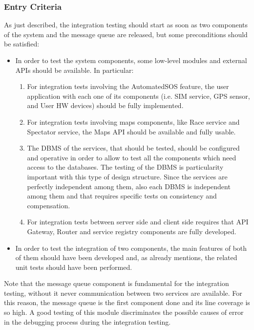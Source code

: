 \subsubsection{Entry Criteria}
As just described, the integration testing should start as soon as two components of the system and the message queue are released, but some preconditions should be satisfied:
\begin{itemize}
\item In order to test the system components, some low-level modules and external APIs should be available. In particular: 
\begin{enumerate}
\item For integration tests involving the AutomatedSOS feature, the user application with each one of its components (i.e. SIM service, GPS sensor, and User HW devices) should be fully implemented.
\item For integration tests involving maps components, like Race service and Spectator service, the Maps API should be available and fully usable.
\item The DBMS of the services, that should be tested, should be configured and operative in order to allow to test all the components which need access to the databases. The testing of the DBMS is particularity important with this type of design structure. Since the services are perfectly independent among them, also each DBMS is independent among them and that requires specific tests on consistency and compensation.
\item For integration tests between server side and client side requires that API Gateway, Router and service registry components are fully developed.
\end{enumerate}
\item In order to test the integration of two components, the main features of both of them should have been developed and, as already mentions, the related unit tests should have been performed.
\end{itemize}
Note that the message queue component is fundamental for the integration testing, without it never communication between two services are available. For this reason, the message queue is the first component done and its line coverage is so high. A good testing of this module discriminates the possible causes of error in the debugging process during the integration testing.  
